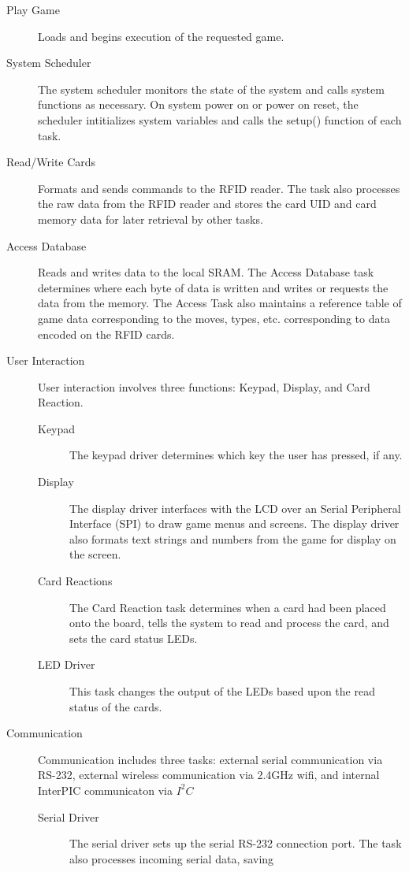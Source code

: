 \documentclass[12pt]{article} %
\begin{document}
\begin{description}
	\item[Play Game] Loads and begins execution of the requested game.
	\item[System Scheduler] The system scheduler monitors the state of the system
		and calls system functions as necessary. On system power on or power on
		reset, the scheduler intitializes system variables and calls the setup()
		function of each task.
	\item[Read/Write Cards] Formats and sends commands to the RFID reader. The
		task also processes the raw data from the RFID reader and stores the card
		UID and card memory data for later retrieval by other tasks.
	\item[Access Database] Reads and writes data to the local SRAM. The Access
		Database task determines where each byte of data is written and writes or
		requests the data from the memory. The Access Task also maintains a
		reference table of game data corresponding to the moves, types, etc.
		corresponding to data encoded on the RFID cards.
	\item[User Interaction] User interaction involves three functions: Keypad,
		Display, and Card Reaction.
		\begin{description}
			\item[Keypad] The keypad driver determines which key the user has
				pressed, if any.
			\item[Display] The display driver interfaces with the LCD over an Serial
				Peripheral Interface (SPI) to draw game menus and screens. The display
				driver also formats text strings and numbers from the game for display
				on the screen.
			\item[Card Reactions] The Card Reaction task determines when a card had
				been placed onto the board, tells the system to read and process the
				card, and sets the card status LEDs.
			\item[LED Driver] This task changes the output of the LEDs based upon the
				read status of the cards.
		\end{description}
	\item[Communication] Communication includes three tasks: external serial
		communication via RS-232, external wireless communication via 2.4GHz wifi,
		and internal InterPIC communicaton via $I^2C$
		\begin{description}
			\item[Serial Driver] The serial driver sets up the serial RS-232
				connection port. The task also processes incoming serial data, saving

\end{description}
\end{description}
\end{document}
